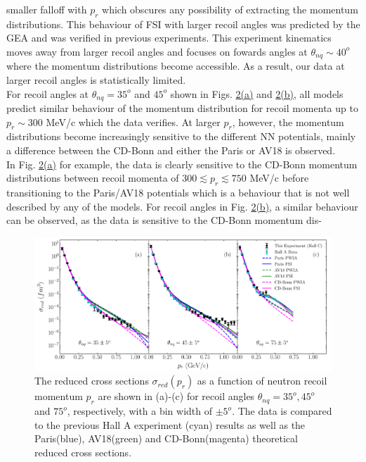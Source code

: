 smaller falloff with $p_{r}$ which obscures any possibility of extracting the momentum distributions. This behaviour of FSI with larger recoil angles was predicted by the GEA\cite{sargsian_2001,PhysRevC.56.1124} and was verified in previous experiments\cite{PhysRevLett.107.262501,PhysRevLett.98.262502}.
This experiment kinematics moves away from larger recoil angles and focuses on fowards angles at $\theta_{nq}\sim 40^{o}$ where the momentum distributions become accessible. As a result, our data at larger recoil angles
is statistically limited. \\
\indent For recoil angles at $\theta_{nq}=35^{o}$ and $45^{o}$ shown in Figs. \hyperref[fig:fig2]{2(a)} and  \hyperref[fig:fig2]{2(b)},  all models predict similar behaviour of the
momentum distribution for recoil momenta up to $p_{r}\sim$300 MeV/c which the data verifies. At larger $p_{r}$, however, the momentum distributions become increasingly sensitive to the different
NN potentials, mainly a difference between the CD-Bonn and either the Paris or AV18 is observed. \\
\indent In Fig. \hyperref[fig:fig2]{2(a)} for example, the data is clearly sensitive to the CD-Bonn momentum distributions between recoil momenta of $300\lesssim p_{r}\lesssim750$ MeV/c before transitioning
to the Paris/AV18 potentials which is a behaviour that is not well described by any of the models. For recoil angles in Fig. \hyperref[fig:fig2]{2(b)},
a similar behaviour can be observed, as the data is sensitive to the CD-Bonn momentum dis-
\onecolumngrid
\begin{center}
\begin{figure}[hb!]
\includegraphics[scale=0.5]{../prl_plots/PRL_plot1.pdf}
\caption{The reduced cross sections $\sigma_{red}(p_{r})$ as a function of neutron recoil momentum $p_{r}$ are shown in (a)-(c) for recoil angles $\theta_{nq}=35^{o}, 45^{o}$ and $75^{o}$, respectively,
with a bin width of $\pm 5^{o}$. The data is compared to the previous Hall A experiment (cyan) results\cite{PhysRevLett.107.262501} as well as the Paris(blue), AV18(green) and CD-Bonn(magenta) theoretical reduced cross sections.}
\label{fig:fig2}
\end{figure}
\end{center} \\

